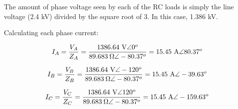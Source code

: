 The amount of phase voltage seen by each of the RC loads is simply the line voltage (2.4 kV) divided by the square root of 3.  In this case, 1.386 kV.

\vskip 10pt

Calculating each phase current:

$$I_A = {V_A \over Z_A} = {1386.64 \hbox{ V} \angle 0^o \over 89.683 \> \Omega \angle -80.37^o} = 15.45 \hbox{ A} \angle 80.37^o$$

$$I_B = {V_B \over Z_B} = {1386.64 \hbox{ V} \angle -120^o \over 89.683 \> \Omega \angle -80.37^o} = 15.45 \hbox{ A} \angle -39.63^o$$

$$I_C = {V_C \over Z_C} = {1386.64 \hbox{ V} \angle 120^o \over 89.683 \> \Omega \angle -80.37^o} = 15.45 \hbox{ A} \angle -159.63^o$$




